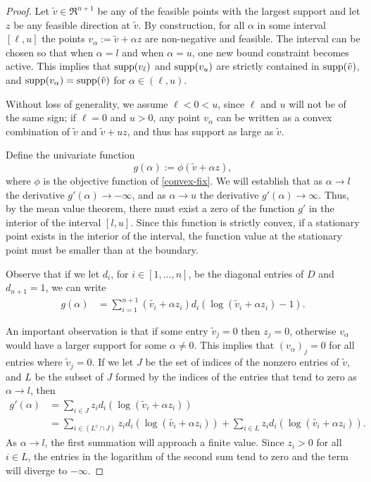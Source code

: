 \documentclass[smallextended]{svjour3}       %
\newcommand*{\supp}{\mbox{\rm supp}}
\newcommand*{\0}{\mathbf{0}}
\newcommand*{\1}{\mathbf{1}}
\begin{document}
\begin{proof}
	Let $\tilde{v}\in \Re^{n+1}$ be any of the feasible points with the largest
	support and let $z$ be any feasible direction at $\tilde{v}$. By
	construction, for all $\alpha$ in some interval $[\ell,u]$ the points
	$v_\alpha:= \tilde{v} + \alpha z$ are non-negative and feasible.  The
	interval can be chosen so that when $\alpha=l$ and when $\alpha=u$, one new
	bound constraint becomes active.  This implies that $\supp(v_\ell)$ and
	$\supp(v_u)$ are strictly contained in $\supp(\tilde{v})$, and
	$\supp(v_\alpha) = \supp(\tilde{v})$ for $\alpha \in (\ell,u)$.
	
	Without loss of generality, we assume $\ell<0<u$, since $\ell$ and $u$ will
	not be of the same sign; if $\ell = 0$ and $u>0$, any point $v_{\alpha}$ can
	be written as a convex combination of $\tilde{v}$ and $\tilde{v}+uz$, and
	thus has support as large as $\tilde{v}$.

	Define the univariate function 
	\begin{equation}   
		g(\alpha) := \phi(\tilde{v} + \alpha z), 
		\label{univariate}
	\end{equation} 
	where $\phi$ is the objective function of \eqref{convex-fix}.  We will
	establish that as $\alpha\rightarrow l$ the derivative $g'(\alpha)\rightarrow
	-\infty$, and as $\alpha\rightarrow u$ the derivative $g'(\alpha)\rightarrow
	\infty$.  Thus, by the mean value theorem, there must exist a zero of the 
	function $g'$ in the	interior of the interval $[l,u]$.  Since this function is
	strictly convex, if a stationary point exists in the interior of the
	interval, the function value at the stationary point must be smaller than at
	the boundary.

	Observe that if we let $d_i$, for $i\in[1,\dots ,n]$, be the diagonal entries
	of $D$ and $d_{n+1}=1$, we can write 
  \begin{align*}
	 g(\alpha) &=\sum_{i=1}^{n+1} (\tilde{v_i} + \alpha z_i) d_i\left(\log(\tilde{v}_i + \alpha z_i)-1\right).
  \end{align*} 

    An important observation is that if some entry $\tilde{v}_j=0$ then
    $z_j=0$, otherwise $v_\alpha$ would have a larger support for some $\alpha
    \neq 0$.  This implies that $(v_\alpha)_j=0$ for all entries where
    $\tilde{v}_j=0$.  If we let $J$ be the set of indices of the nonzero
    entries of $\tilde{v}$, and $L$ be the subset of $J$ formed by the indices
    of the entries that tend to zero as $\alpha \rightarrow l$, then 
   \begin{align*} 
	 	g'(\alpha) &=\sum_{i\in J} z_i d_i(\log(\tilde{v}_i + \alpha z_i)) \\            
		&= \sum_{i\in (L^c\cap J)} z_id_i(\log{(\tilde{v_i}+\alpha z_i)}) + \sum_{i\in L}
		 z_id_i(\log{(\tilde{v_i}+\alpha z_i)}). 
	\end{align*} 
	As $\alpha \rightarrow l$, the first summation will approach a finite value.
	Since $z_i>0$ for all $i\in L$, the entries in the logarithm of the second
	sum tend to zero and the term will diverge to $-\infty$.


\end{proof}
\end{document}
